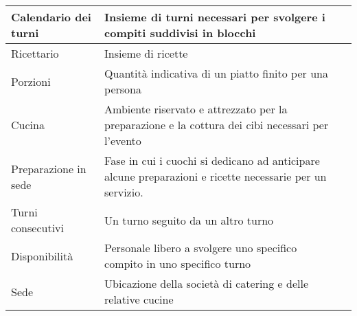 \begin{longtable}{|p{4cm}|p{4cm}|p{4cm}|}
  \hline
  Calendario dei turni & Insieme di turni necessari per svolgere i compiti suddivisi in blocchi & \\
  \hline
  Ricettario & Insieme di ricette & \\
  \hline
  Porzioni & Quantità indicativa di un piatto finito per una persona & \\
  \hline
  Cucina & Ambiente riservato e attrezzato per la preparazione e la cottura dei cibi necessari per l'evento & \\
  \hline
  Preparazione in sede & Fase in cui i cuochi si dedicano ad anticipare alcune preparazioni e ricette necessarie per un servizio. & \\
  \hline
  Turni consecutivi & Un turno seguito da un altro turno & \\
  \hline
  Disponibilità & Personale libero a svolgere uno specifico compito in uno specifico turno & \\
  \hline
  Sede & Ubicazione della società di catering e delle relative cucine & \\
  \hline
  \end{longtable}